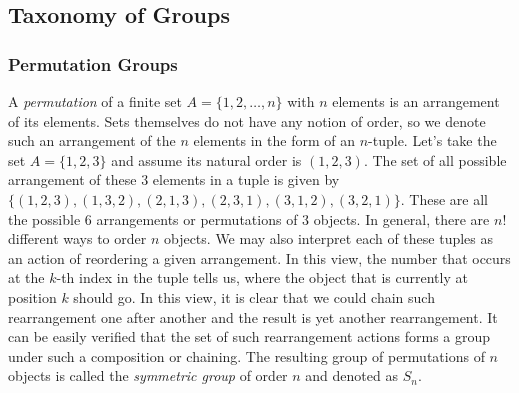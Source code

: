 


\subsection{Taxonomy of Groups}


\subsubsection{Permutation Groups}
A \emph{permutation} of a finite set $A = \{ 1,2,\ldots,n \}$ with $n$ elements is an arrangement of its elements. Sets themselves do not have any notion of order, so we denote such an arrangement of the $n$ elements in the form of an $n$-tuple. Let's take the set $A = \{ 1,2,3 \}$ and assume its natural order is $(1,2,3)$. The set of all possible arrangement of these $3$ elements in a tuple is given by $\{ (1,2,3), (1,3,2), (2,1,3), (2,3,1), (3,1,2), (3,2,1) \}$. These are all the possible $6$ arrangements or permutations of $3$ objects. In general, there are $n!$ different ways to order $n$ objects. We may also interpret each of these tuples as an action of reordering a given arrangement. In this view, the number that occurs at the $k$-th index in the tuple tells us, where the object that is currently at position $k$ should go. In this view, it is clear that we could chain such rearrangement one after another and the result is yet another rearrangement. It can be easily verified that the set of such rearrangement actions forms a group under such a composition or chaining. The resulting group of permutations of $n$ objects is called the \emph{symmetric group} of order $n$ and denoted as $S_n$.



